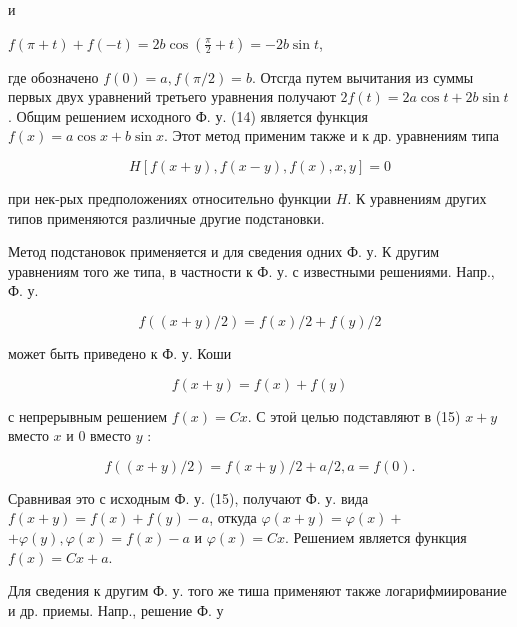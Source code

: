 \documentclass[10pt]{article}
\begin{document}
и



$f(\pi+t)+f(-t)=2 b \cos \left(\frac{\pi}{2}+t\right)=-2 b \sin t$,



где обозначено $f(0)=a, f(\pi / 2)=b$. Отсгда путем вычитания из суммы первых двух уравнений третьего уравнения получают $2 f(t)=2 a \cos t+2 b \sin t$. Общим решением исходного Ф. у. (14) является функция $f(x)=a \cos x+b \sin x$. Этот метод применим также и $\mathbf{к}$ др. уравнениям типа



\[

H[f(x+y), f(x-y), f(x), x, y]=0

\]



при нек-рых предположениях относительно функции $H$. К уравнениям других типов применяются различные другие подстановки.



Метод подстановок применяется и для сведения одних Ф. у. К другим уравнениям того же типа, в частности к Ф. у. с известными решениями. Напр., Ф. у.



\[

f((x+y) / 2)=f(x) / 2+f(y) / 2

\]



может быть приведено к Ф. у. Коши



\[

f(x+y)=f(x)+f(y)

\]



с непрерывным решением $f(x)=C x$. С этоӥ целью подставляют в (15) $x+y$ вместо $x$ и 0 вместо $y$ :



\[

f((x+y) / 2)=f(x+y) / 2+a / 2, a=f(0) .

\]



Сравнивая это с исходным Ф. у. (15), получают Ф. у. вида $f(x+y)=f(x)+f(y)-a$, откуда $\varphi(x+y)=\varphi(x)+$ $+\varphi(y), \varphi(x)=f(x)-a$ и $\varphi(x)=C x$. Решением является функция $f(x)=C x+a$.



Для сведения к другим Ф. у. того же тиша применяют также логарифмиирование и др. приемы. Напр., решение Ф. у
\end{document}
